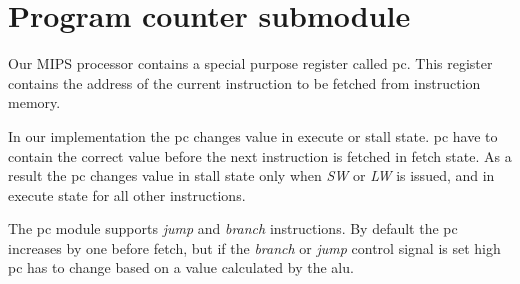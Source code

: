 \section{Program counter submodule}

Our MIPS processor contains a special purpose register called \gls{pc}.
This register contains the address of the current instruction to be fetched from instruction memory.

In our implementation the \gls{pc} changes value in execute or stall state.
\gls{pc} have to contain the correct value before the next instruction is fetched in fetch state.
As a result the \gls{pc} changes value in stall state only when \textit{SW} or \textit{LW} is issued, and in execute state for all other instructions.

The \gls{pc} module supports \textit{jump} and \textit{branch} instructions.
By default the \gls{pc} increases by one before fetch, but if the \textit{branch} or \textit{jump} control signal is set high \gls{pc} has to change based on a value calculated by the \gls{alu}.
